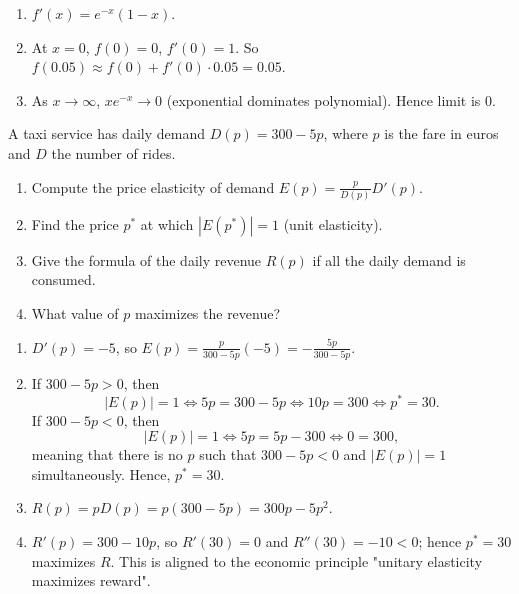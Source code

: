 \documentclass[11pt]{exam}
\begin{document}
\begin{questions}
\begin{solution}
\begin{enumerate}[label=(\alph*)]
  \item \(f'(x)=e^{-x}(1 - x).\)
  \item At \(x=0\), \(f(0)=0\), \(f'(0)=1\).  So \(f(0.05)\approx f(0)+f'(0)\cdot0.05=0.05.\)
  \item As \(x\to\infty\), \(x e^{-x}\to0\) (exponential dominates polynomial).  Hence limit is 0.
\end{enumerate}
\end{solution}

\question[3]
A taxi service has daily demand \(D(p)=300-5p\), where \(p\) is the fare in euros and \(D\) the number of rides.
\begin{enumerate}[label=(\alph*)]
  \item Compute the price elasticity of demand \(E(p)=\frac{p}{D(p)}D'(p)\).
  \item Find the price \(p^*\) at which \(|E(p^*)|=1\) (unit elasticity).
  \item Give the formula of the daily revenue \(R(p)\) if all the daily demand is consumed.
  \item What value of $p$ maximizes the revenue?
\end{enumerate}

\begin{solution}
\begin{enumerate}[label=(\alph*)]
  \item \(D'(p)=-5\), so \(E(p)=\frac{p}{300-5p}(-5) = -\frac{5p}{300-5p}.\)
  \item If $300 - 5p > 0$, then 
  $$
  |E(p)|=1 \Leftrightarrow 5p=300-5p \Leftrightarrow 10p=300 \Leftrightarrow p^*=30.
  $$
  If $300 - 5p < 0$, then
  $$
  |E(p)|=1 \Leftrightarrow 5p=5p-300 \Leftrightarrow 0=300,
  $$
  meaning that there is no $p$ such that $300 - 5p < 0$ and $|E(p)|=1$ simultaneously. Hence, $p^* = 30$.
  \item \(R(p)=pD(p) = p(300-5p)=300p-5p^2\). 
  \item \(R'(p)=300-10p\), so \(R'(30)=0\) and \(R''(30)=-10<0\); hence \(p^*=30\) maximizes \(R\).
  This is aligned to the economic principle "unitary elasticity maximizes reward". 
\end{enumerate}
\end{solution}


\end{questions}
\end{document}
